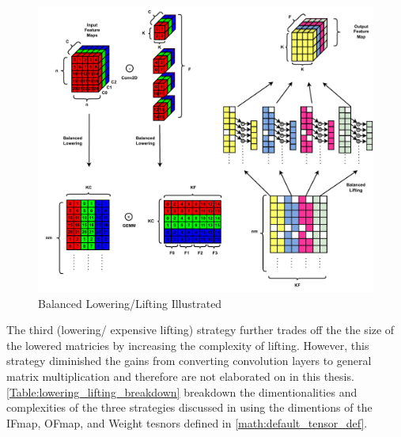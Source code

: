 \begin{figure}[!ht]
    \centering
    \includegraphics[scale=0.6]{fig/BalancedLoweringLifting.pdf}
    \caption{Balanced Lowering/Lifting Illustrated}
    \label{fig:balanced_lowering_lifting}
\end{figure}

The third (lowering/ expensive lifting) strategy further trades off the
the size of the lowered matricies by increasing the complexity of lifting.
However, this strategy diminished the gains from converting convolution layers
to general matrix multiplication and therefore are not elaborated on in this
thesis. \autoref{Table:lowering_lifting_breakdown} breakdown the
dimentionalities and complexities of the three strategies discussed in
\cite{cafe_con_troll} using the dimentions of the IFmap, OFmap, and Weight
tesnors defined in \autoref{math:default_tensor_def}.     


